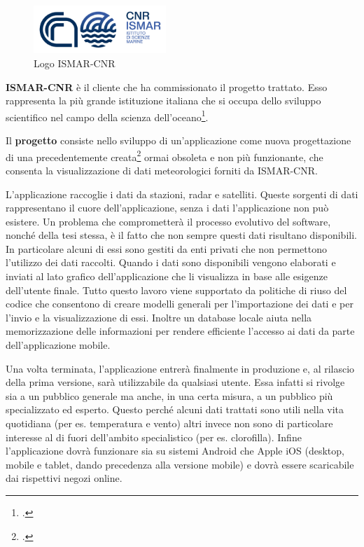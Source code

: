 \documentclass[./main.tex]{subfiles}
\begin{document}
\begin{figure}[!ht]
\vspace{1cm}
\centering
\includegraphics[width=5cm]{images/logo_cnr.pdf}
\caption{Logo ISMAR-CNR}
\label{fig:cnr}
\end{figure}

\textbf{ISMAR-CNR} è il cliente che ha commissionato il progetto trattato. Esso rappresenta la più grande istituzione italiana che si occupa dello sviluppo scientifico nel campo della scienza dell'oceano\footcite[\url{https://www.ismar.cnr.it/}]{website-ismar-cnr}.\par

Il \textbf{progetto} consiste nello sviluppo di un'applicazione come nuova progettazione di una precedentemente creata\footcite[\url{https://www.ismar.cnr.it/terza-missione/app/\#2}]{website-ismar-cnr} ormai obsoleta e non più funzionante, che consenta la visualizzazione di dati meteorologici forniti da ISMAR-CNR.\par

L'applicazione raccoglie i dati da stazioni, radar e satelliti. Queste sorgenti di dati rappresentano il cuore dell'applicazione, senza i dati l'applicazione non può esistere. Un problema che comprometterà il processo evolutivo del software, nonché della tesi stessa, è il fatto che non sempre questi dati risultano disponibili. In particolare alcuni di essi sono gestiti da enti privati che non permettono l'utilizzo dei dati raccolti. Quando i dati sono disponibili vengono elaborati e inviati al lato grafico dell'applicazione che li visualizza in base alle esigenze dell'utente finale. Tutto questo lavoro viene supportato da politiche di riuso del codice che consentono di creare modelli generali per l'importazione dei dati e per l'invio e la visualizzazione di essi. Inoltre un database locale aiuta nella memorizzazione delle informazioni per rendere efficiente l'accesso ai dati da parte dell'applicazione mobile.\par 

Una volta terminata, l'applicazione entrerà finalmente in produzione e, al rilascio della prima versione, sarà utilizzabile da qualsiasi utente. Essa infatti si rivolge sia a un pubblico generale ma anche, in una certa misura, a un pubblico più specializzato ed esperto. Questo perché alcuni dati trattati sono utili nella vita quotidiana (per es. temperatura e vento) altri invece non sono di particolare interesse al di fuori dell'ambito specialistico (per es. clorofilla). Infine l'applicazione dovrà funzionare sia su sistemi Android che Apple iOS (desktop, mobile e tablet, dando precedenza alla versione mobile) e dovrà essere scaricabile dai rispettivi negozi online.\par
\end{document}

